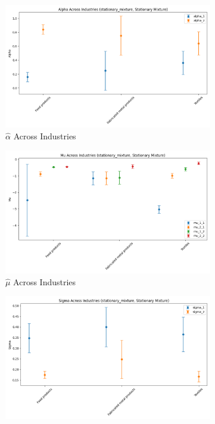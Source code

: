 \documentclass{article}
\begin{document}
\begin{figure}[ht!]
    \centering 
    \caption{I.I.D Mixture Model Across Industries}
    \begin{subfigure}[t]{0.32\textwidth}
        \centering
        \includegraphics[width=\textwidth]{figure/stationary_mixture_alpha_across_industries.png}
        \caption{$\hat\alpha$ Across Industries}
    \end{subfigure}
    \begin{subfigure}[t]{0.32\textwidth}
        \centering
        \includegraphics[width=\textwidth]{figure/stationary_mixture_mu_across_industries.png}
        \caption{$\hat\mu$ Across Industries}
    \end{subfigure}
    \begin{subfigure}[t]{0.32\textwidth}
        \centering
        \includegraphics[width=\textwidth]{figure/stationary_mixture_sigma_across_industries.png}

\end{subfigure}
\end{figure}
\end{document}
